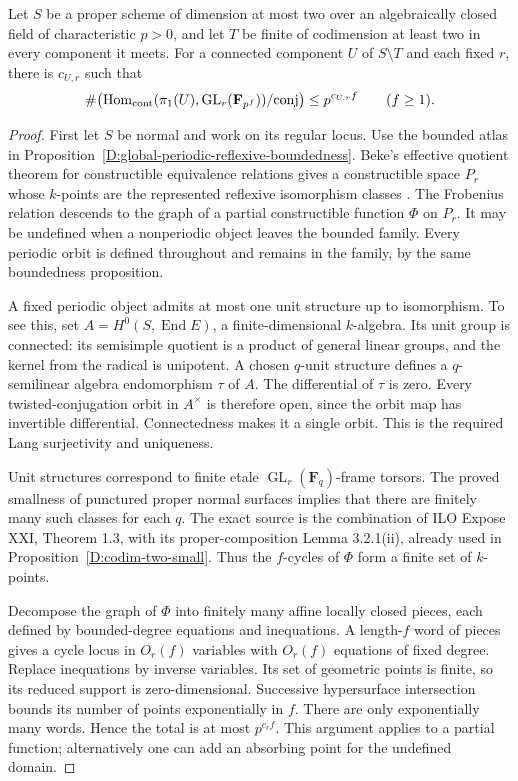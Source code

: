 \begin{theorem}
\label{D:surface-fixed-rank-representation-growth}
Let $S$ be a proper scheme of dimension at most two over an algebraically
closed field of characteristic $p>0$, and let $T$ be finite of codimension
at least two in every component it meets. For a connected component
$U$ of $S\setminus T$ and each fixed $r$, there is $c_{U,r}$ such that
\[
 \#\bigl(\operatorname{Hom}_{\rm cont}
 (\pi_1(U),\operatorname{GL}_r(\mathbf F_{p^f}))/\mathrm{conj}\bigr)
 \le p^{c_{U,r}f}\qquad(f\ge1).
\]
\end{theorem}
\begin{proof}
First let $S$ be normal and work on its regular locus. Use the bounded
atlas in Proposition~\ref{D:global-periodic-reflexive-boundedness}.
Beke's effective quotient theorem for constructible equivalence
relations gives a constructible space $P_r$ whose $k$-points are the
represented reflexive isomorphism classes
\citep[Theorem 2]{Beke2011FixedRankB}. The Frobenius relation descends
to the graph of a partial constructible function $\Phi$ on $P_r$.
It may be undefined when a nonperiodic object leaves the bounded
family. Every periodic orbit is defined throughout and remains in
the family, by the same boundedness proposition.

A fixed periodic object admits at most one unit structure up to
isomorphism. To see this, set $A=H^0(S,\operatorname{End}E)$, a
finite-dimensional $k$-algebra. Its unit group is connected: its
semisimple quotient is a product of general linear groups, and the
kernel from the radical is unipotent. A chosen $q$-unit structure
defines a $q$-semilinear algebra endomorphism $\tau$ of $A$.
The differential of $\tau$ is zero. Every twisted-conjugation orbit
in $A^\times$ is therefore open, since the orbit map has invertible
differential. Connectedness makes it a single orbit. This is the
required Lang surjectivity and uniqueness.

Unit structures correspond to finite etale
$\operatorname{GL}_r(\mathbf F_q)$-frame torsors. The proved smallness
of punctured proper normal surfaces implies that there are finitely
many such classes for each $q$. The exact source is the combination
of ILO Expose XXI, Theorem 1.3, with its proper-composition
Lemma 3.2.1(ii), already used in Proposition~\ref{D:codim-two-small}.
Thus the $f$-cycles of $\Phi$ form a finite set of $k$-points.

Decompose the graph of $\Phi$ into finitely many affine locally closed
pieces, each defined by bounded-degree equations and inequations.
A length-$f$ word of pieces gives a cycle locus in $O_r(f)$ variables
with $O_r(f)$ equations of fixed degree. Replace inequations by inverse
variables. Its set of geometric points is finite, so its reduced
support is zero-dimensional. Successive hypersurface intersection
bounds its number of points exponentially in $f$. There are only
exponentially many words. Hence the total is at most $p^{c_rf}$.
This argument applies to a partial function; alternatively one can add
an absorbing point for the undefined domain.


\end{proof}
